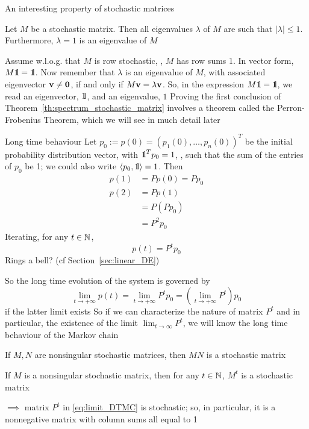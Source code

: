 \documentclass[aspectratio=169]{beamer}
\begin{document}
\begin{frame}{An interesting property of stochastic matrices}
\begin{theorem}\label{th:spectrum_stochastic_matrix}
	Let $M$ be a stochastic matrix. Then all eigenvalues $\lambda$ of $M$ are such that $|\lambda|\leq 1$. 
	Furthermore, $\lambda =1$ is an eigenvalue of $M$
\end{theorem}
\vfill
Assume w.l.o.g. that $M$ is row stochastic, \ie, $M$ has row sums 1. In vector form, $M\nbOne=\nbOne$. Now remember that $\lambda$ is an eigenvalue of $M$, with associated eigenvector $\bv\neq \b0$, if and only if $M\mathbf{v}=\lambda \mathbf{v}$. So, in the expression $M\nbOne=\nbOne$, we read an eigenvector, $\nbOne$, and an eigenvalue, $1$
\vfill
Proving the first conclusion of Theorem~\ref{th:spectrum_stochastic_matrix} involves a theorem called the Perron-Frobenius Theorem, which we will see in much detail later
\end{frame}

\begin{frame}{Long time behaviour}
Let $p_0:=p(0)=(p_1(0),\ldots,p_n(0))^T$ be the initial probability distribution vector, with $\nbOne^Tp_0=1$, \ie, such that the sum of the entries of $p_0$ be 1; we could also write $\langle p_0,\nbOne\rangle = 1$. Then
\begin{align*}
p(1) &= Pp(0) = Pp_0 \\
p(2) &= Pp(1)\\
&= P(Pp_0) \\
&= P ^2p_0
\end{align*}
Iterating, for any $t\in\mathbb{N}$,
\[
p(t)=P^tp_0
\]
\vfill
Rings a bell? (cf Section~\ref{sec:linear_DE})
\end{frame}

\begin{frame}
So the long time evolution of the system is governed by
\begin{equation}\label{eq:limit_DTMC}
\lim_{t\rightarrow +\infty}p(t)
=\lim_{t\rightarrow +\infty}P^tp_0
=\left(\lim_{t\rightarrow +\infty}P^t\right)p_0
\end{equation}
if the latter limit exists
\vfill
So if we can characterize the nature of matrix $P^t$ and in particular, the existence of the limit $\lim_{t\to\infty}P^t$, we will know the long time behaviour of the Markov chain
\end{frame}

\begin{frame}
\begin{theorem}
If $M,N$ are nonsingular stochastic matrices, then $MN$ is a stochastic matrix
\end{theorem}
\vfill
\begin{corollary}
If $M$ is a nonsingular stochastic matrix, then for any $t\in\mathbb{N}$, $M^t$ is a stochastic matrix
\end{corollary}
\vfill
$\implies$ matrix $P^t$ in \eqref{eq:limit_DTMC} is stochastic; so, in particular, it is a nonnegative matrix with column sums all equal to 1
\end{frame}
\end{document}
